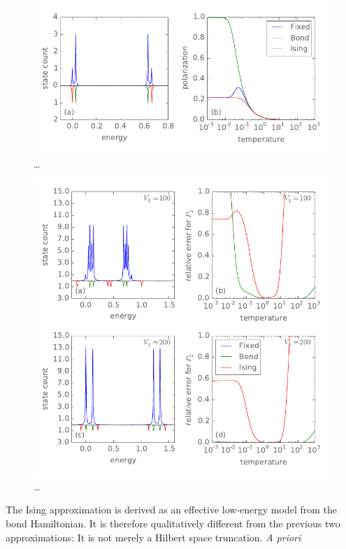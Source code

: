 %
\begin{figure}
  \center
  \includegraphics{ising_approximation1}
  \caption{\ldots}
  \label{fig:ising_approximation1}
\end{figure}
%
%
\begin{figure}
  \center
  \includegraphics{ising_approximation2}
  \caption{\ldots}
  \label{fig:ising_approximation2}
\end{figure}
%
The Ising approximation is derived as an effective low-energy model from the
bond Hamiltonian. It is therefore qualitatively different from the previous two
approximations: It is not merely a Hilbert space truncation. \emph{A priori}
